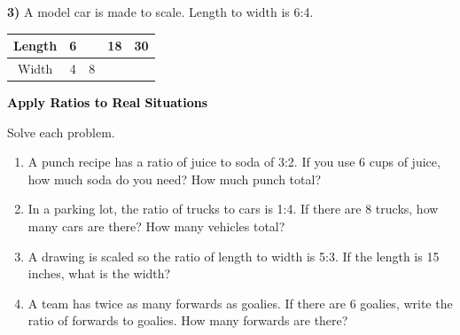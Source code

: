 \documentclass[12pt, letterpaper, fleqn]{article}
\newcommand{\blank}{\underline{\hspace{2.2cm}}}
\begin{document}
\vspace{2cm}

\noindent
\textbf{3)} A model car is made to scale. Length to width is 6:4.
\vspace{2cm}
\begin{center}
\begin{tabular}{c|c|c|c|c}
Length & 6 & \blank & 18 & 30 \\
\hline
Width & 4 & 8 & \blank & \blank
\end{tabular}
\end{center}

\newpage

\begin{tcolorbox}[colback=customteal!20]
\large\textcolor{black}{\textbf{Apply Ratios to Real Situations}}
\end{tcolorbox}

\noindent
Solve each problem.

\vspace{3mm}

\begin{enumerate}[itemsep=2cm, leftmargin=0.6cm]

\item A punch recipe has a ratio of juice to soda of 3:2. If you use 6 cups of juice, how much soda do you need? How much punch total?

\vspace{1.8cm}

\item In a parking lot, the ratio of trucks to cars is 1:4. If there are 8 trucks, how many cars are there? How many vehicles total?

\vspace{1.8cm}

\item A drawing is scaled so the ratio of length to width is 5:3. If the length is 15 inches, what is the width?

\vspace{1.8cm}

\item A team has twice as many forwards as goalies. If there are 6 goalies, write the ratio of forwards to goalies. How many forwards are there?

\vspace{1.8cm}

\end{enumerate}
\end{document}
